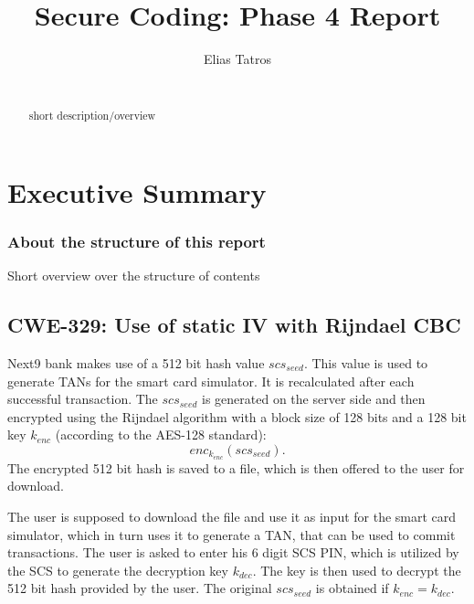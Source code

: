 \documentclass{llncs}
\begin{document}
\title{Secure Coding: Phase 4 Report}

\author{Elias Tatros\\\\}


\maketitle

%
\begin{abstract}
short description/overview
\end{abstract}
%
\section{Executive Summary}
%


\subsubsection{About the structure of this report\\}
Short overview over the structure of contents
%

\subsection{CWE-329: Use of static IV with Rijndael CBC}

Next9 bank makes use of a 512 bit hash value $scs_{seed}$. This value is used to generate TANs for the smart card simulator. It is recalculated after each successful transaction. The $scs_{seed}$ is generated on the server side and then encrypted using the Rijndael algorithm with a block size of 128 bits and a 128 bit key $k_{enc}$ (according to the AES-128 standard): $$enc_{k_{enc}} (scs_{seed}).$$
The encrypted 512 bit hash is saved to a file, which is then offered to the user for download. 

The user is supposed to download the file and use it as input for the smart card simulator, which in turn uses it to generate a TAN, that can be used to commit transactions. The user is asked to enter his 6 digit SCS PIN, which is utilized by the SCS to generate the decryption key $k_{dec}$. The key is then used to decrypt the 512 bit hash provided by the user. The original $scs_{seed}$ is obtained if $k_{enc} = k_{dec}$.
\end{document}
